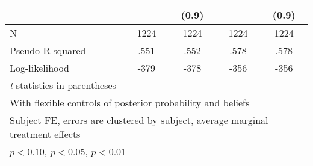 \begin{table}[htbp]
\begin{tabular}{l*{4}{c}}
                &                  &    (0.9)         &                  &    (0.9)         \\
\hline
N               &     1224         &     1224         &     1224         &     1224         \\
Pseudo R-squared&     .551         &     .552         &     .578         &     .578         \\
Log-likelihood  &     -379         &     -378         &     -356         &     -356         \\
\hline\hline
\multicolumn{5}{l}{\footnotesize \textit{t} statistics in parentheses}\\
\multicolumn{5}{l}{\footnotesize With flexible controls of posterior probability and beliefs}\\
\multicolumn{5}{l}{\footnotesize Subject FE, errors are clustered by subject, average marginal treatment effects}\\
\multicolumn{5}{l}{\footnotesize \sym{*} \(p<0.10\), \sym{**} \(p<0.05\), \sym{***} \(p<0.01\)}\\
\end{tabular}
\end{table}
